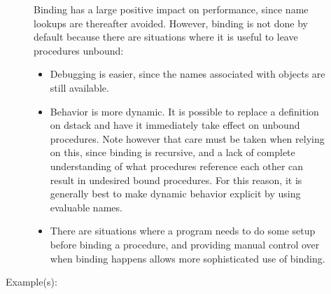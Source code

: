 \begin{description}
\begin{description}
		Binding has a large positive impact on performance, since name
		lookups are thereafter avoided.  However, binding is not done by
		default because there are situations where it is useful to leave
		procedures unbound:
		\begin{itemize}
		\item{Debugging is easier, since the names associated with
		objects are still available.}
		\item{Behavior is more dynamic.  It is possible to replace a
		definition on dstack and have it immediately take effect on
		unbound procedures.  Note however that care must be taken
		when relying on this, since binding is recursive, and a lack of
		complete understanding of what procedures reference each other
		can result in undesired bound procedures.  For this reason, it
		is generally best to make dynamic behavior explicit by using
		evaluable names.}
		\item{There are situations where a program needs to do some
		setup before binding a procedure, and providing manual control
		over when binding happens allows more sophisticated use of
		binding.}
		\end{itemize}
	\item[Example(s): ]\begin{verbatim}


\end{verbatim}
\end{description}
\end{description}
